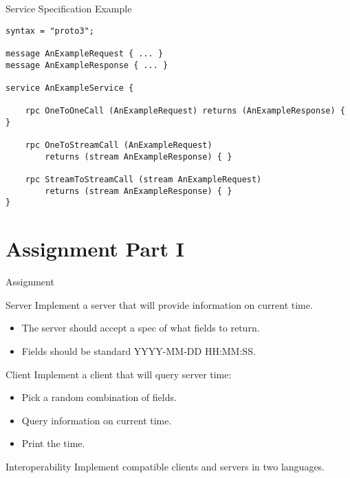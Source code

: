 

\begin{frame}[fragile]{Service Specification Example}
\begin{lstlisting}[style=mini]
syntax = "proto3";

message AnExampleRequest { ... }
message AnExampleResponse { ... }

service AnExampleService {

    rpc OneToOneCall (AnExampleRequest) returns (AnExampleResponse) { }

    rpc OneToStreamCall (AnExampleRequest)
        returns (stream AnExampleResponse) { }

    rpc StreamToStreamCall (stream AnExampleRequest)
        returns (stream AnExampleResponse) { }
}
\end{lstlisting}
\end{frame}


\section{Assignment Part I}


\begin{frame}{Assignment}
    \begin{block}{Server}
        Implement a server that will provide information on current time.
        \begin{itemize}
            \item The server should accept a spec of what fields to return.
            \item Fields should be standard YYYY-MM-DD HH:MM:SS.
        \end{itemize}
    \end{block}

    \begin{block}{Client}
        Implement a client that will query server time:
        \begin{itemize}
            \item Pick a random combination of fields.
            \item Query information on current time.
            \item Print the time.
        \end{itemize}
    \end{block}

    \begin{block}{Interoperability}
        Implement compatible clients and servers in two languages.
    \end{block}
\end{frame}


